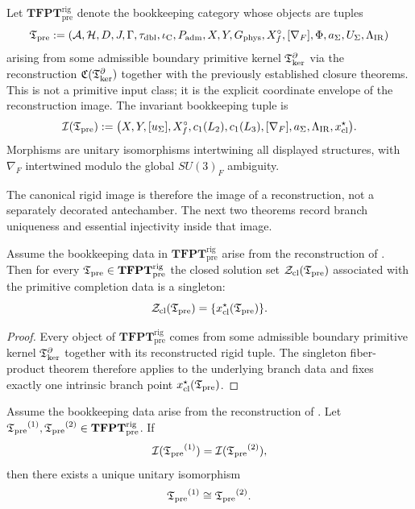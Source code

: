 \begin{definition}
\label{def:tfpt-rigid-pre-category}
Let $\mathbf{TFPT}^{\mathrm{rig}}_{\mathrm{pre}}$ denote the bookkeeping category whose objects are
tuples
\[
\mathfrak T_{\mathrm{pre}}
:=
(\mathcal A,\mathcal H,D,J,\Gamma,\tau_{\mathrm{dbl}},\iota_{\mathrm C},P_{\mathrm{adm}},X,Y,G_{\mathrm{phys}},X_f^\circ,[\nabla_F],\Phi,a_\Sigma,U_\Sigma,\Lambda_{\mathrm{IR}})
\]
arising from some admissible boundary primitive kernel $\mathfrak T_{\mathrm{ker}}^\partial$ via the reconstruction
$\mathfrak C(\mathfrak T_{\mathrm{ker}}^\partial)$ together with the previously established closure theorems. This is not a
primitive input class; it is the explicit coordinate envelope of the reconstruction image. The
invariant bookkeeping tuple is
\[
\mathcal I(\mathfrak T_{\mathrm{pre}})
:=
\bigl(
X,Y,[u_\Sigma],X_f^\circ,c_1(L_2),c_1(L_3),[\nabla_F],a_\Sigma,\Lambda_{\mathrm{IR}},x_{\mathrm{cl}}^\star
\bigr).
\]
Morphisms are unitary isomorphisms intertwining all displayed structures, with $\nabla_F$
intertwined modulo the global $SU(3)_F$ ambiguity.
\end{definition}

The canonical rigid image is therefore the image of a reconstruction, not a separately decorated
antechamber. The next two theorems record branch uniqueness and essential injectivity inside that
image.

\begin{theorem}
\label{thm:branch-uniqueness}
Assume the bookkeeping data in $\mathbf{TFPT}^{\mathrm{rig}}_{\mathrm{pre}}$ arise from the
reconstruction of . Then for every
$\mathfrak T_{\mathrm{pre}}\in\mathbf{TFPT}^{\mathrm{rig}}_{\mathrm{pre}}$ the closed solution set
$\mathcal Z_{\mathrm{cl}}(\mathfrak T_{\mathrm{pre}})$ associated with the primitive completion data is a
singleton:
\[
\mathcal Z_{\mathrm{cl}}(\mathfrak T_{\mathrm{pre}})=\{x_{\mathrm{cl}}^\star(\mathfrak T_{\mathrm{pre}})\}.
\]
\end{theorem}

\begin{proof}
Every object of $\mathbf{TFPT}^{\mathrm{rig}}_{\mathrm{pre}}$ comes from some admissible boundary
primitive kernel $\mathfrak T_{\mathrm{ker}}^\partial$ together with its reconstructed rigid tuple. The singleton
fiber-product theorem
 therefore applies to the underlying branch data and fixes
exactly one intrinsic branch point $x_{\mathrm{cl}}^\star(\mathfrak T_{\mathrm{pre}})$.
\end{proof}

\begin{theorem}
\label{thm:spectral-completeness-rigid-tfpt}
Assume the bookkeeping data arise from the reconstruction of
. Let
${\mathfrak T_{\mathrm{pre}}}^{(1)},{\mathfrak T_{\mathrm{pre}}}^{(2)}\in\mathbf{TFPT}^{\mathrm{rig}}_{\mathrm{pre}}$. If
\[
\mathcal I({\mathfrak T_{\mathrm{pre}}}^{(1)})=\mathcal I({\mathfrak T_{\mathrm{pre}}}^{(2)}),
\]
then there exists a unique unitary isomorphism
\[
{\mathfrak T_{\mathrm{pre}}}^{(1)}\cong {\mathfrak T_{\mathrm{pre}}}^{(2)}.
\]
\end{theorem}

